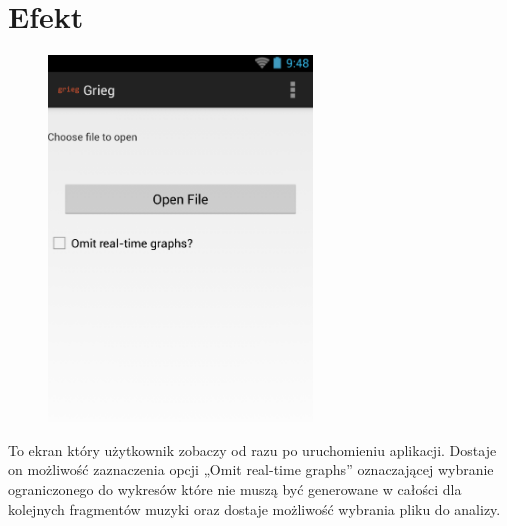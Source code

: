 \section{Efekt} 
\begin{figure}[H]
  \centering
  \includegraphics[width=7cm]{images/first_screen}
\end{figure}

To ekran który użytkownik zobaczy od razu po uruchomieniu aplikacji. Dostaje on możliwość
zaznaczenia opcji „Omit real-time graphs” oznaczającej wybranie ograniczonego  do
wykresów które nie muszą być generowane w całości dla kolejnych fragmentów muzyki oraz dostaje
możliwość wybrania pliku do analizy.

